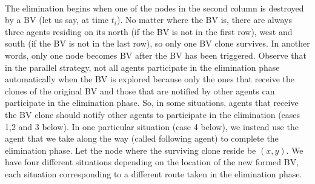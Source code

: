 \\
The elimination begins when one of the nodes in the second column is destroyed by a BV (let us say, at time $t_i$). No matter where   the BV is, there are always three agents residing on its north (if the BV is not in the first row), west and south (if the BV is not in the last row), so only one BV clone survives. In another words, only one node becomes BV   after the BV has been triggered. Observe that in the parallel strategy, not all agents participate in the elimination phase automatically when the BV is explored because only the ones  that receive the clones of the original BV and those that are notified by other agents can participate in the elimination phase. So,  in some situations, agents that receive the BV clone should notify other agents to participate in the elimination (cases 1,2 and 3 below). In one particular situation (case 4 below), we  instead use the agent  that we take along the way (called  following agent) to complete the elimination phase. Let the node where the surviving clone reside be $(x, y)$. We have four different situations   depending on the location of the new formed BV, each situation corresponding to a different route  taken in the elimination phase.
